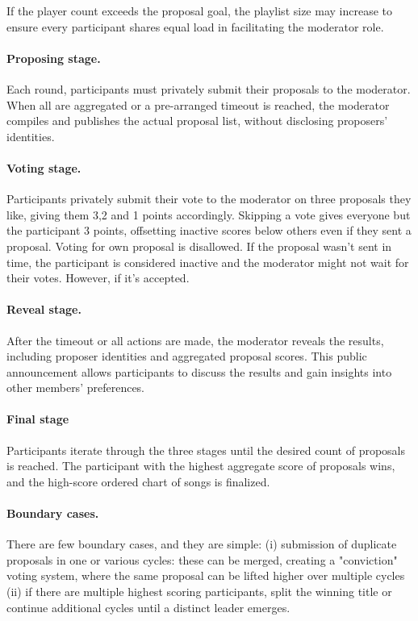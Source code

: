\documentclass{article}
\begin{document}
\begin{CJK}{UTF8}{gbsn}
\begin{multicols}{2}
        If the player count exceeds the proposal goal, the playlist size may increase to ensure every participant shares equal load in facilitating the moderator role.
        \paragraph{Proposing stage.}Each round, participants must privately submit their proposals to the moderator. When all are aggregated or a pre-arranged timeout is reached, the moderator compiles and publishes the actual proposal list, without disclosing proposers’ identities.
        \paragraph{Voting stage.}Participants privately submit their vote to the moderator on three proposals they like, giving them 3,2 and 1 points accordingly. Skipping a vote gives everyone but the participant 3 points, offsetting inactive scores below others even if they sent a proposal. Voting for own proposal is disallowed.
        If the proposal wasn’t sent in time, the participant is considered inactive and the moderator might not wait for their votes. However, if it’s accepted.
        \paragraph{Reveal stage.}After the timeout or all actions are made, the moderator reveals the results, including proposer identities and aggregated proposal scores. This public announcement allows participants to discuss the results and gain insights into other members’ preferences.
        \paragraph{Final stage}Participants iterate through the three stages until the desired count of proposals is reached. The participant with the highest aggregate score of proposals wins, and the high-score ordered chart of songs is finalized.
        \paragraph{Boundary cases.} There are few boundary cases, and they are simple: (i) submission of duplicate proposals in one or various cycles: these can be merged, creating a "conviction" voting system, where the same proposal can be lifted higher over multiple cycles (ii) if there are multiple highest scoring participants, split the winning title or continue additional cycles until a distinct leader emerges.


\end{multicols}
\end{CJK}
\end{document}
